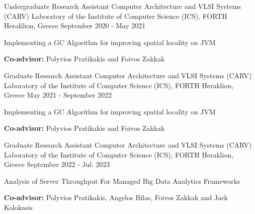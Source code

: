 

\begin{cventries}


  \cventry
    {Undergraduate Research Assistant} %
    {Computer Architecture and VLSI Systems (CARV) Laboratory of the Institute of Computer Science (ICS), FORTH} %
    {Heraklion, Greece} %
    {September 2020 - May 2021} %
    {
      \begin{cvitems} %
        \item {Implementing a GC Algorithm for improving spatial locality on JVM}
        \item{\textbf{Co-advisor:} Polyvios Pratikakis and Foivos Zakkak}
      \end{cvitems}
    }
  \cventry
    {Graduate Research Assistant} %
    {Computer Architecture and VLSI Systems (CARV) Laboratory of the Institute of Computer Science (ICS), FORTH} %
    {Heraklion, Greece} %
    {May 2021 - September 2022} %
    {
      \begin{cvitems} %
        \item {Implementing a GC Algorithm for improving spatial locality on JVM}
        \item{\textbf{Co-advisor:} Polyvios Pratikakis and Foivos Zakkak}
      \end{cvitems}
    }
  \cventry
    {Graduate Research Assistant} %
    {Computer Architecture and VLSI Systems (CARV) Laboratory of the Institute of Computer Science (ICS), FORTH} %
    {Heraklion, Greece} %
    {September 2022 - Jul. 2023} %
    {
      \begin{cvitems} %
        \item {Analysis of Server Throughput For Managed Big Data Analytics Frameworks}
        \item{\textbf{Co-advisor:} Polyvios Pratikakis, Angelos Bilas, Foivos Zakkak and Jack Kolokasis}
      \end{cvitems}
    }
\end{cventries}
